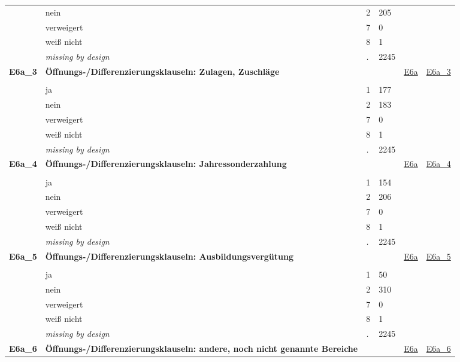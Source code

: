 \begin{longtable}{| L{2.45cm} | L{6cm} | C{1.5cm} | R{1cm} | C{2.25cm} | C{2.25cm} |}
   & nein & 2 & 205 &  &  \\ 
   & verweigert & 7 & 0 &  &  \\ 
   & weiß nicht & 8 & 1 &  &  \\ 
   & \textit{missing by design} & \textit{.} & 2245 &  &  \\ 
   \midrule
\textbf{E6a\_3}\label{var:E6a:3} & \textbf{Öffnungs-/Differenzierungsklauseln: Zulagen, Zuschläge} &  &  & \hyperref[E6a]{E6a} & \hyperref[var:suf:E6a:3]{E6a\_3} \\ 
   &  &  &  &  &  \\ 
   & ja & 1 & 177 &  &  \\ 
   & nein & 2 & 183 &  &  \\ 
   & verweigert & 7 & 0 &  &  \\ 
   & weiß nicht & 8 & 1 &  &  \\ 
   & \textit{missing by design} & \textit{.} & 2245 &  &  \\ 
   \midrule
\textbf{E6a\_4}\label{var:E6a:4} & \textbf{Öffnungs-/Differenzierungsklauseln: Jahressonderzahlung} &  &  & \hyperref[E6a]{E6a} & \hyperref[var:suf:E6a:4]{E6a\_4} \\ 
   &  &  &  &  &  \\ 
   & ja & 1 & 154 &  &  \\ 
   & nein & 2 & 206 &  &  \\ 
   & verweigert & 7 & 0 &  &  \\ 
   & weiß nicht & 8 & 1 &  &  \\ 
   & \textit{missing by design} & \textit{.} & 2245 &  &  \\ 
   \midrule
\textbf{E6a\_5}\label{var:E6a:5} & \textbf{Öffnungs-/Differenzierungsklauseln: Ausbildungsvergütung} &  &  & \hyperref[E6a]{E6a} & \hyperref[var:suf:E6a:5]{E6a\_5} \\ 
   &  &  &  &  &  \\ 
   & ja & 1 & 50 &  &  \\ 
   & nein & 2 & 310 &  &  \\ 
   & verweigert & 7 & 0 &  &  \\ 
   & weiß nicht & 8 & 1 &  &  \\ 
   & \textit{missing by design} & \textit{.} & 2245 &  &  \\ 
   \midrule
\textbf{E6a\_6}\label{var:E6a:6} & \textbf{Öffnungs-/Differenzierungsklauseln: andere, noch nicht genannte Bereiche} &  &  & \hyperref[E6a]{E6a} & \hyperref[var:suf:E6a:6]{E6a\_6} \\ 

\end{longtable}
